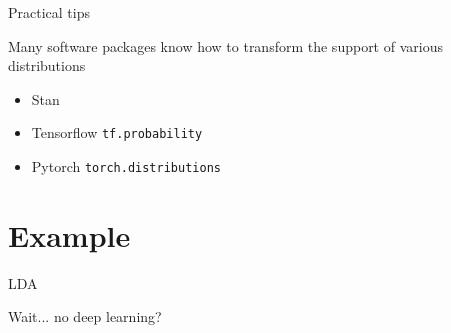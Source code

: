 \documentclass[14pt,dvipsnames]{beamer}
\begin{document}
\begin{frame}{Practical tips}

	Many software packages know how to transform the support of various distributions
	\begin{itemize}
		\item Stan
		\item Tensorflow \texttt{tf.probability}
		\item Pytorch \texttt{torch.distributions}
	\end{itemize}
\end{frame}

\section{Example}

\begin{frame}{LDA}
\end{frame}

\begin{frame}{Wait... no deep learning?}
\end{frame}



\begin{frame}[allowframebreaks]


\end{frame}
\end{document}
